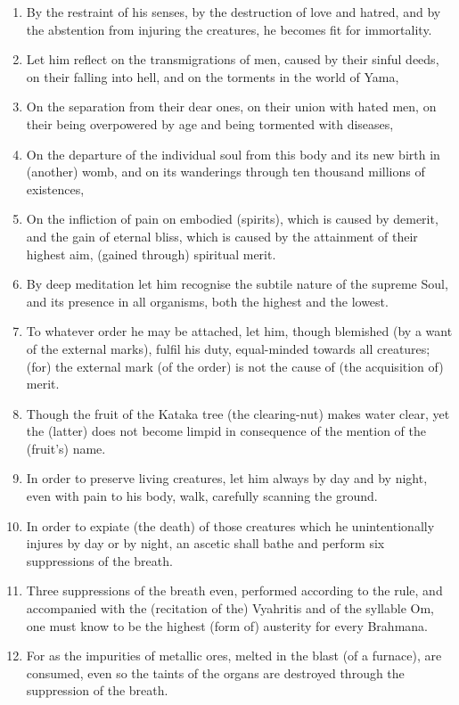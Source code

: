 \begin{enumerate}
\item By the restraint of his senses, by the destruction of love and hatred, and by the abstention from injuring the creatures, he becomes fit for immortality.
\item Let him reflect on the transmigrations of men, caused by their sinful deeds, on their falling into hell, and on the torments in the world of Yama,
\item On the separation from their dear ones, on their union with hated men, on their being overpowered by age and being tormented with diseases,
\item On the departure of the individual soul from this body and its new birth in (another) womb, and on its wanderings through ten thousand millions of existences,
\item On the infliction of pain on embodied (spirits), which is caused by demerit, and the gain of eternal bliss, which is caused by the attainment of their highest aim, (gained through) spiritual merit.
\item By deep meditation let him recognise the subtile nature of the supreme Soul, and its presence in all organisms, both the highest and the lowest.
\item To whatever order he may be attached, let him, though blemished (by a want of the external marks), fulfil his duty, equal-minded towards all creatures; (for) the external mark (of the order) is not the cause of (the acquisition of) merit.
\item Though the fruit of the Kataka tree (the clearing-nut) makes water clear, yet the (latter) does not become limpid in consequence of the mention of the (fruit's) name.
\item In order to preserve living creatures, let him always by day and by night, even with pain to his body, walk, carefully scanning the ground.
\item In order to expiate (the death) of those creatures which he unintentionally injures by day or by night, an ascetic shall bathe and perform six suppressions of the breath.
\item Three suppressions of the breath even, performed according to the rule, and accompanied with the (recitation of the) Vyahritis and of the syllable Om, one must know to be the highest (form of) austerity for every Brahmana.
\item For as the impurities of metallic ores, melted in the blast (of a furnace), are consumed, even so the taints of the organs are destroyed through the suppression of the breath.

\end{enumerate}
